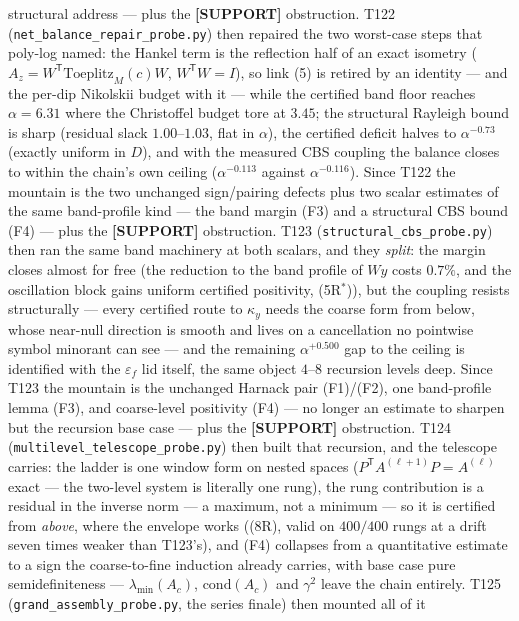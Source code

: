 \documentclass[11pt,a4paper]{article}
\begin{document}
structural address --- plus the \textbf{[SUPPORT]} obstruction. T122
(\texttt{net\_balance\_repair\_probe.py}) then repaired the two worst-case steps that poly-log
named: the Hankel term is the reflection half of an exact isometry
($A_z=W^{\mathsf T}\mathrm{Toeplitz}_M(c)W$, $W^{\mathsf T}W=I$), so link (5) is retired by an
identity --- and the per-dip Nikolskii budget with it --- while the certified band floor
reaches $\alpha=6.31$ where the Christoffel budget tore at $3.45$; the structural Rayleigh
bound is sharp (residual slack $1.00$--$1.03$, flat in $\alpha$), the certified deficit halves
to $\alpha^{-0.73}$ (exactly uniform in $D$), and with the measured CBS coupling the balance
closes to within the chain's own ceiling ($\alpha^{-0.113}$ against $\alpha^{-0.116}$). Since
T122 the mountain is the two unchanged sign/pairing defects plus two scalar estimates of the
same band-profile kind --- the band margin (F3) and a structural CBS bound (F4) --- plus the
\textbf{[SUPPORT]} obstruction. T123 (\texttt{structural\_cbs\_probe.py}) then ran the same
band machinery at both scalars, and they \emph{split}: the margin closes almost for free
(the reduction to the band profile of $Wy$ costs $0.7\%$, and the oscillation block gains
uniform certified positivity, (5R$^*$)), but the coupling resists structurally --- every
certified route to $\kappa_y$ needs the coarse form from below, whose near-null direction is
smooth and lives on a cancellation no pointwise symbol minorant can see --- and the remaining
$\alpha^{+0.500}$ gap to the ceiling is identified with the $\varepsilon_f$ lid itself, the
same object $4$--$8$ recursion levels deep. Since T123 the mountain is the unchanged Harnack
pair (F1)/(F2), one band-profile lemma (F3), and coarse-level positivity (F4) --- no longer
an estimate to sharpen but the recursion base case --- plus the \textbf{[SUPPORT]}
obstruction. T124 (\texttt{multilevel\_telescope\_probe.py}) then built that recursion, and
the telescope carries: the ladder is one window form on nested spaces
($P^{\mathsf T}A^{(\ell+1)}P=A^{(\ell)}$ exact --- the two-level system is literally one
rung), the rung contribution is a residual in the inverse norm --- a maximum, not a minimum
--- so it is certified from \emph{above}, where the envelope works ((8R), valid on $400/400$
rungs at a drift seven times weaker than T123's), and (F4) collapses from a quantitative
estimate to a sign the coarse-to-fine induction already carries, with base case pure
semidefiniteness --- $\lambda_{\min}(A_c)$, $\mathrm{cond}(A_c)$ and $\gamma^2$ leave the
chain entirely. T125 (\texttt{grand\_assembly\_probe.py}, the series finale) then mounted all of it
\end{document}
